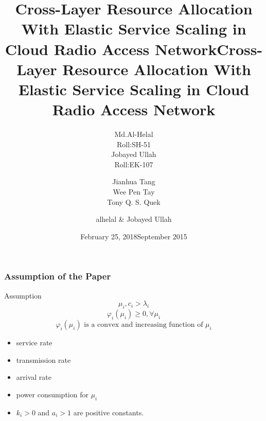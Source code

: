 \documentclass[usenames,dvipsnames]{beamer}
\begin{document}
  \title{Cross-Layer  Resource  Allocation With  Elastic Service Scaling in Cloud Radio Access Network}
  \author[alhelal \& Jobayed Ullah]{
  \parbox{2.5cm}{
\centering Md.Al-Helal\\Roll:SH-51}\hspace{1cm}
\parbox{2.5cm}{
{\centering Jobayed Ullah\\Roll:EK-107}}
}
\date{February 25, 2018}
\begin{frame}
  \maketitle
\end{frame}
  \title{Cross-Layer  Resource  Allocation With  Elastic Service Scaling in Cloud Radio Access Network}
  \author{Jianhua Tang\\ Wee Pen Tay\\ Tony Q. S. Quek}
\date{September 2015}
\begin{frame}
  \maketitle
\end{frame}
  \author{alhelal \& Jobayed Ullah}
\begin{frame}
  \frametitle{Assumption of the Paper}
  \begin{exampleblock}{Assumption}
    \[
      \mu_{i},c_{i} > \lambda_{i}
    \]
    \[
      \varphi_{i}(\mu_{i})\geq 0, \forall \mu_{i}
    \]
    \[
      \varphi_{i}(\mu_{i}) \text{ is a convex and increasing function of } \mu_{i}
    \]
  \end{exampleblock}
  \begin{itemize}
    \item { service rate}
    \item { transmission rate}
    \item { arrival rate}
    \item { power consumption for $\mu_{i}$}
    \item $k_{i} > 0$ and $a_{i} > 1$ are positive constants.
  \end{itemize}
\end{frame}
\end{document}
